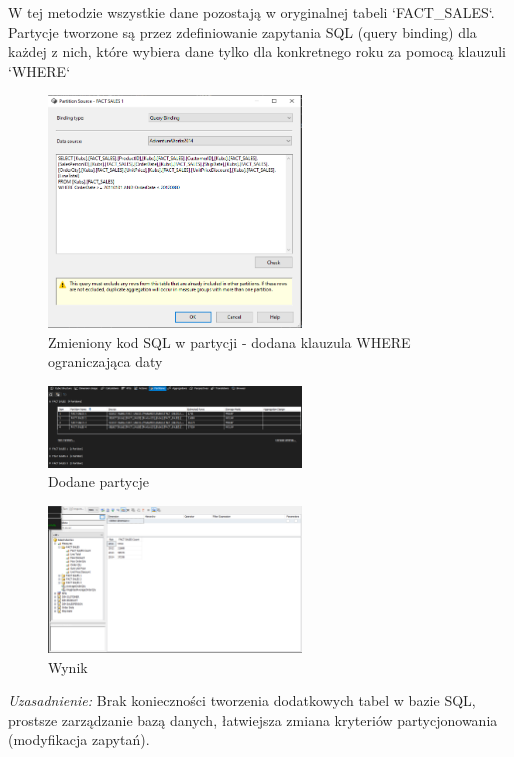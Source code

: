 \documentclass[a4paper,12pt]{article}
\begin{document}
W tej metodzie wszystkie dane pozostają w oryginalnej tabeli `FACT\_SALES`. Partycje tworzone są przez zdefiniowanie
zapytania SQL (query binding) dla każdej z nich, które wybiera dane tylko dla konkretnego roku za pomocą klauzuli `WHERE`

\begin{figure}[H]
  \centering
  \includegraphics[width=0.6\textwidth]{4b_source.png}
  \caption{Zmieniony kod SQL w partycji - dodana klauzula WHERE ograniczająca daty}
\end{figure}

\begin{figure}[H]
  \centering
  \includegraphics[width=0.6\textwidth]{4b.png}
  \caption{Dodane partycje}
\end{figure}

\begin{figure}[H]
  \centering
  \includegraphics[width=0.6\textwidth]{4a_result.png}
  \caption{Wynik}
\end{figure}

\textit{Uzasadnienie:} Brak konieczności tworzenia dodatkowych tabel w bazie SQL, prostsze zarządzanie bazą danych, łatwiejsza zmiana kryteriów partycjonowania (modyfikacja zapytań).
\end{document}
